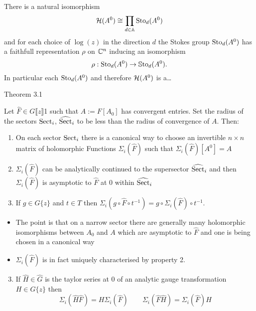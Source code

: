 \begin{frame}
  \begin{thm}
    There is a natural isomorphism
    \[
      \mathcal{H}(A^0)\cong\prod_{d\in\mathbb{A}}\operatorname{Sto}_d(A^0)
    \]
    and for each choice of $\log(z)$ in the direction $d$ the Stokes group
    $\operatorname{Sto}_d(A^0)$ has a faithfull representation $\rho$ on $\mathbb{C}^n$ inducing an
    isomorphism
    \[
      \rho:\operatorname{Sto}_d(A^0)\to\operatorname{\mathbb{S}to}_d(A^0).
    \]
    In particular each $\operatorname{Sto}_d(A^0)$ and therefore $\mathcal{H}(A^0)$ is a\dots
  \end{thm}
\end{frame}

\begin{frame}{Theorem 3.1}
  \begin{thm}
    Let $\hat{F}\in G\llbracket z\rrbracket$1 such that $A:=F[A_0]$ has
    convergent entries.
    Set the radius of the sectors $\operatorname{Sect}_i$, $\widehat{\operatorname{Sect}}_i$ to be less than
    the radius of convergence of $A$.
    Then:
    \begin{enumerate}
      \item On each sector $\operatorname{Sect}_i$ there is a canonical way to choose an
        invertible $n\times n$ matrix of holomorphic Functions
        $\Sigma_i(\hat F)$ such that $\Sigma_i(\hat F)[A^0]=A$
      \item $\Sigma_i(\hat F)$ can be analytically continued to the supersector
        $\widehat{\operatorname{Sect}}_i$ and then $\Sigma_i(\hat F)$ is asymptotic to $\hat F$
        at $0$ within $\widehat{\operatorname{Sect}}_i$
      \item If $g\in G\{z\}$ and $t\in T$ then
        $\Sigma_i(g\circ\hat F \circ t^{-1})=g\circ\Sigma_i(\hat F)\circ t^{-1}$.
    \end{enumerate}
  \end{thm}
  \begin{itemize}
    \item The point is that on a narrow sector there are generally many
      holomorphic isomorphisms between $A_0$ and $A$ which are asymptotic to
      $\hat F$ and one is being chosen in a canonical way
    \item $\Sigma_i(\hat F)$ is in fact uniquely characterised by property 2.
  \end{itemize}
  \begin{prop}
    \begin{enumerate}
    \setcounter{enumi}{2}
    \item If $\hat H\in\hat G$ is the taylor series at $0$ of an analytic gauge
      transformation $H\in G\{z\}$ then
      \[
        \Sigma_i(\hat H \hat F)=H\Sigma_i(\hat F)
        \qquad
        \Sigma_i(\hat F \hat H)=\Sigma_i(\hat F)H
      \]
  \end{enumerate}
  \end{prop}
\end{frame}

